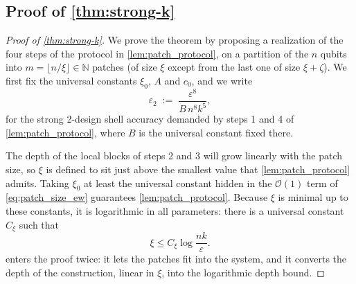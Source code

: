 \documentclass[
    aps,
    superscriptaddress,
    onecolumn,
    10pt,
    prx,
    nofootinbib
]{revtex4-2}
\theoremstyle{namedstatement}
\theoremstyle{plain}
\begin{document}
\subsection{Proof of \cref{thm:strong-k}}
\label{app:proof-strong-k}

\begin{proof}[Proof of \cref{thm:strong-k}]





We prove the theorem by proposing a realization of the four steps of the protocol in
\cref{lem:patch_protocol}, on a partition of the $n$ qubits into
$m=\lfloor n/\xi\rfloor\in\mathbb{N}$ patches (of size $\xi$ except from the last one of size $\xi+\zeta$). We first fix the universal constants
$\xi_{0}$, $A$ and $c_{0}$, and we write
\begin{equation}
    \varepsilon_2 \;:=\; \frac{\varepsilon^{8}}{B\, n^{8} k^{5}},
    \label{eq:shell_accuracy}
\end{equation}
for the strong 2-design shell accuracy demanded by steps 1 and 4 of \cref{lem:patch_protocol}, where
$B$ is the universal constant fixed there.

The depth of the local blocks of steps 2 and 3 will grow linearly with the patch size,
so $\xi$ is defined to sit just above the smallest value that \cref{lem:patch_protocol}
admits. Taking $\xi_{0}$ at least the universal constant hidden in the
$\mathcal{O}(1)$ term of \cref{eq:patch_size_ew} guarantees \cref{lem:patch_protocol}.
Because $\xi$ is minimal up to these constants, it is logarithmic in all parameters:
there is a universal constant $C_{\xi}$ such that
\begin{equation}
    \xi \leq C_{\xi}\log\frac{nk}{\varepsilon}.
    \label{eq:xi_upper}
\end{equation}
 enters the proof twice: it lets the patches fit into the system, and
it converts the depth of the construction, linear in $\xi$, into the logarithmic depth
bound.


\end{proof}
\end{document}
